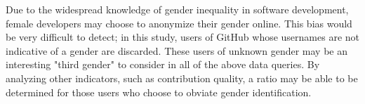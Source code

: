 \documentclass{sigplanconf}
\begin{document}
Due to the widespread knowledge of gender inequality in software development,
female developers may choose to anonymize their gender online. This bias would
be very difficult to detect; in this study, users of GitHub whose usernames are
not indicative of a gender are discarded. These users of unknown gender may be
an interesting "third gender" to consider in all of the above data queries. By
analyzing other indicators, such as contribution quality, a ratio may be able to
be determined for those users who choose to obviate gender identification.


\acks




\renewcommand{\bibfont}{\normalsize}


\begin{thebibliography}
\softraggedright


\end{thebibliography}
\end{document}
